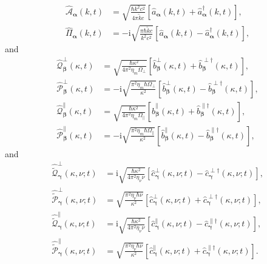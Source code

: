 \documentclass{article}
\begin{document}
\begin{equation}
\begin{split}
\hat{\mathcal{A}}_{\bm{\alpha}}(k,t) &= \sqrt{\frac{\hbar k^2c^2}{4\pi\tilde{k}c}}\left[\hat{a}_{\bm{\alpha}}(k,t) + \hat{a}^\dagger_{\bm{\alpha}}(k,t)\right],\\
\hat{\mathit{\Pi}}_{\bm{\alpha}}(k,t) &= -\mathrm{i}\sqrt{\frac{\pi\hbar\tilde{k}c}{k^2c^2}}\left[\hat{a}_{\bm{\alpha}}(k,t) - \hat{a}_{\bm{\alpha}}^\dagger(k,t)\right],
\end{split}
\end{equation}
and
\begin{equation}
\begin{split}
\hat{\mathcal{Q}}_{\bm{\beta}}^\perp(\kappa,t) &= \sqrt{\frac{\hbar\kappa^2}{4\pi^2\eta_m\Omega_\perp}}\left[\hat{b}_{\bm{\beta}}^\perp(\kappa,t) + \hat{b}_{\bm{\beta}}^{\perp\dagger}(\kappa,t)\right],\\
\hat{\mathcal{P}}_{\bm{\beta}}^\perp(\kappa,t) &= -\mathrm{i}\sqrt{\frac{\pi^2\eta_m\hbar\Omega_\perp}{\kappa^2}}\left[\hat{b}_{\bm{\beta}}^\perp(\kappa,t) - \hat{b}_{\bm{\beta}}^{\perp\dagger}(\kappa,t)\right],\\[0.5em]
\hat{\mathcal{Q}}_{\bm{\beta}}^\parallel(\kappa,t) &= \sqrt{\frac{\hbar\kappa^2}{4\pi^2\eta_m\Omega_\parallel}}\left[\hat{b}_{\bm{\beta}}^\parallel(\kappa,t) + \hat{b}_{\bm{\beta}}^{\parallel\dagger}(\kappa,t)\right],\\
\hat{\mathcal{P}}_{\bm{\beta}}^\parallel(\kappa,t) &= -\mathrm{i}\sqrt{\frac{\pi^2\eta_m\hbar\Omega_\parallel}{\kappa^2}}\left[\hat{b}_{\bm{\beta}}^\parallel(\kappa,t) - \hat{b}_{\bm{\beta}}^{\parallel\dagger}(\kappa,t)\right],
\end{split}
\end{equation}
and
\begin{equation}
\begin{split}
\hat{\tilde{\mathcal{Q}}}_{\bm{\gamma}}^\perp(\kappa,\nu;t) &= \mathrm{i}\sqrt{\frac{\hbar\kappa^2}{4\pi^2\eta_\nu\nu}}\left[\hat{c}_{\bm{\gamma}}^{\perp}(\kappa,\nu;t) - \hat{c}_{\bm{\gamma}}^{\perp\dagger}(\kappa,\nu;t)\right],\\
\hat{\tilde{\mathcal{P}}}_{\bm{\gamma}}^\perp(\kappa,\nu;t) &= \sqrt{\frac{\pi^2\eta_\nu\hbar\nu}{\kappa^2}}\left[\hat{c}_{\bm{\gamma}}^\perp(\kappa,\nu;t) + \hat{c}_{\bm{\gamma}}^{\perp\dagger}(\kappa,\nu;t)\right],\\[0.5em]
\hat{\tilde{\mathcal{Q}}}_{\bm{\gamma}}^\parallel(\kappa,\nu;t) &= \mathrm{i}\sqrt{\frac{\hbar\kappa^2}{4\pi^2\eta_\nu\nu}}\left[\hat{c}_{\bm{\gamma}}^{\parallel}(\kappa,\nu;t) - \hat{c}_{\bm{\gamma}}^{\parallel\dagger}(\kappa,\nu;t)\right],\\
\hat{\tilde{\mathcal{P}}}_{\bm{\gamma}}^\parallel(\kappa,\nu;t) &= \sqrt{\frac{\pi^2\eta_\nu\hbar\nu}{\kappa^2}}\left[\hat{c}_{\bm{\gamma}}^\parallel(\kappa,\nu;t) + \hat{c}_{\bm{\gamma}}^{\parallel\dagger}(\kappa,\nu;t)\right].
\end{split}
\end{equation}
\end{document}
